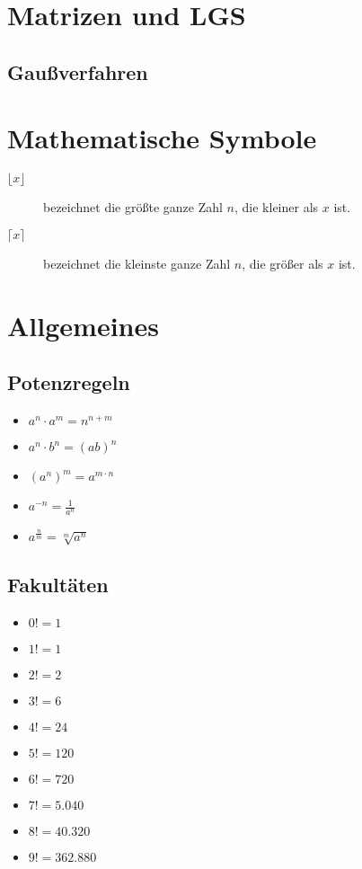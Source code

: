 \documentclass[10pt,a4paper,twoside,twocolumn]{article}
\begin{document}
	
	\section{Matrizen und LGS}
	
	\subsection{Gaußverfahren}
	
	
	
	\section{Mathematische Symbole}

	\begin{description}
		\item[$ \lfloor x \rfloor $] bezeichnet die größte ganze Zahl $ n $, die kleiner als $ x $ ist.
		\item[$ \lceil x \rceil $] bezeichnet die kleinste ganze Zahl $ n $, die größer als $ x $ ist.
	\end{description}

	\section{Allgemeines}
	
	\subsection{Potenzregeln}
	
	\begin{itemize}
		\setlength\itemsep{0em}
		\item $ a^n \cdot a^m = n^{n+m} $
		\item $ a^n \cdot b^n = (ab)^n $
		\item $ {(a^n)}^m = a^{m \cdot n} $
		\item $ a^{-n} = \frac{1}{a^n} $
		\item $ a^{\frac{n}{m}} = \sqrt[m]{a^n} $
	\end{itemize}

	\subsection{Fakultäten}
	
	\begin{itemize}
		\setlength\itemsep{0em}
		\item $ 0! = 1 $
		\item $ 1! = 1 $
		\item $ 2! = 2 $
		\item $ 3! = 6 $
		\item $ 4! = 24 $
		\item $ 5! = 120 $
		\item $ 6! = 720 $
		\item $ 7! = 5.040 $
		\item $ 8! = 40.320 $
		\item $ 9! = 362.880 $
	\end{itemize}
	
\end{document}
